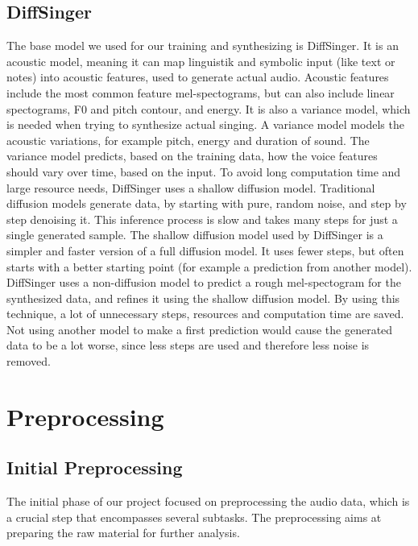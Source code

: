 \documentclass[a4paper]{article}
\begin{document}
	\subsection{DiffSinger}
	The base model we used for our training and synthesizing is DiffSinger. It is an
	acoustic model, meaning it can map linguistik and symbolic input (like text or
	notes) into acoustic features, used to generate actual audio. Acoustic features
	include the most common feature mel-spectograms, but can also include linear
	spectograms, F0 and pitch contour, and energy. It is also a variance model,
	which is needed when trying to synthesize actual singing. A variance model
	models the acoustic variations, for example pitch, energy and duration of sound.
	The variance model predicts, based on the training data, how the voice features
	should vary over time, based on the input. To avoid long computation time and
	large resource needs, DiffSinger uses a shallow diffusion model. Traditional
	diffusion models generate data, by starting with pure, random noise, and step by
	step denoising it. This inference process is slow and takes many steps for just
	a single generated sample. The shallow diffusion model used by DiffSinger is a
	simpler and faster version of a full diffusion model. It uses fewer steps, but
	often starts with a better starting point (for example a prediction from another
	model). DiffSinger uses a non-diffusion model to predict a rough mel-spectogram
	for the synthesized data, and refines it using the shallow diffusion model. By
	using this technique, a lot of unnecessary steps, resources and computation time
	are saved. Not using another model to make a first prediction would cause the
	generated data to be a lot worse, since less steps are used and therefore less
	noise is removed.
	
	
	\section{Preprocessing}
	
	\subsection{Initial Preprocessing}
	The initial phase of our project focused on preprocessing the audio data, which is a crucial step that encompasses several subtasks. The preprocessing aims at preparing the raw material for further analysis.
	
\end{document}
